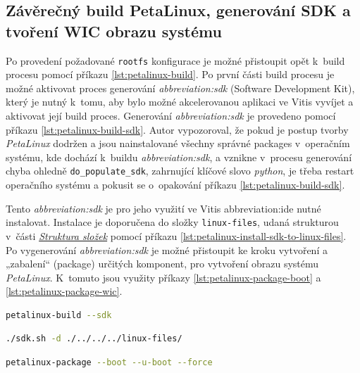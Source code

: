 \documentclass[a4paper, twoside, 11pt]{article}
\begin{document}
	\subsection{Závěrečný build PetaLinux, generování SDK a tvoření WIC obrazu systému}
	Po provedení požadované \texttt{rootfs} konfigurace je možné přistoupit opět k~build procesu pomocí příkazu \ref{lst:petalinux-build}. Po první části build procesu je možné aktivovat proces generování \textit{\gls{abbreviation:sdk}} (Software Development Kit), který je nutný k~tomu, aby bylo možné akcelerovanou aplikaci ve Vitis vyvíjet a aktivovat její build proces. Generování \textit{\gls{abbreviation:sdk}} je provedeno pomocí příkazu \ref{lst:petalinux-build-sdk}. Autor vypozoroval, že pokud je postup tvorby \textit{PetaLinux} dodržen a jsou nainstalované všechny správné packages v~operačním systému, kde dochází k~buildu \textit{\gls{abbreviation:sdk}}, a vznikne v~procesu generování chyba ohledně \texttt{do\_populate\_sdk}, zahrnující klíčové slovo \textit{python}, je třeba restart operačního systému a pokusit se o~opakování příkazu \ref{lst:petalinux-build-sdk}.\par
	Tento \textit{\gls{abbreviation:sdk}} je pro jeho využití ve Vitis \gls{abbreviation:ide} nutné instalovat. Instalace je doporučena do složky \texttt{linux-files}, udaná strukturou v~části \hyperref[sec:struktura-slozek]{\textit{Struktura složek}} pomocí příkazu \ref{lst:petalinux-install-sdk-to-linux-files}.
	Po vygenerování \textit{\gls{abbreviation:sdk}} je možné přistoupit ke kroku vytvoření a „zabalení“ (package) určitých komponent, pro vytvoření obrazu systému \textit{PetaLinux}. K~tomuto jsou využity příkazy \ref{lst:petalinux-package-boot} a \ref{lst:petalinux-package-wic}.\par


\begin{lstlisting}[language={sh}, caption={Příkaz pro aktivování build procesu SDK}, label= {lst:petalinux-build-sdk}, morekeywords={petalinux-build, petalinux-package, petalinux-config}]
petalinux-build --sdk\end{lstlisting}

\begin{lstlisting}[language={sh}, caption={Příkaz pro inslataci SDK}, label= {lst:petalinux-install-sdk-to-linux-files}, morekeywords={petalinux-build, petalinux-package, petalinux-config}]
./sdk.sh -d ./../../../linux-files/\end{lstlisting}

\begin{lstlisting}[language={sh}, caption={Příkaz pro zabalení boot komponent pro tvorbu obrazu systému.}, label= {lst:petalinux-package-boot}, morekeywords={petalinux-build, petalinux-package, petalinux-config}]
petalinux-package --boot --u-boot --force\end{lstlisting}
\end{document}
